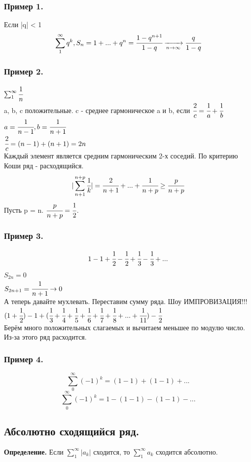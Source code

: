 \documentclass[12pt, paper]{article}
\begin{document}
\subsubsection*{Пример 1.}
Если |q| < 1
\[ \sum_1^\infty q^k, S_n = 1+...+q^n = \cfrac{1-q^{n+1}}{1-q} \xrightarrow[n\to\infty]{} \cfrac{q}{1-q} \]
\subsubsection*{Пример 2.}
$\sum_1^\infty \cfrac{1}{n}$\\
a, b, c положительные. c - среднее гармоническое a и b, если $\cfrac{2}{c} = \cfrac{1}{a} + \cfrac{1}{b}$\\
$a = \cfrac{1}{n-1}, b = \cfrac{1}{n+1}$\\
$\cfrac{2}{c} = (n - 1) + (n + 1) = 2n$\\
Каждый элемент является средним гармоническим 2-х соседий. По критерию Коши ряд - расходящийся.
\[ |\sum_{n+1}^{n+p} \cfrac{1}{k}| = \cfrac{2}{n+1} + ... + \cfrac{1}{n+p} \geq \cfrac{p}{n+p}\]
Пусть p = n. $\cfrac{p}{n+p} = \cfrac{1}{2}$.
\subsubsection*{\textbf{Пример 3.}}
\[ 1 - 1 + \cfrac{1}{2} - \cfrac{1}{2} + \cfrac{1}{3} - \cfrac{1}{3} + ...\]
$S_{2n} = 0$\\
$S_{2n+1} = \cfrac{1}{n+1} \to 0$\\
А теперь давайте мухлевать. Переставим сумму ряда. Шоу ИМПРОВИЗАЦИЯ!!!\\
$(1+\cfrac{1}{2}) - 1 + (\cfrac{1}{3} + \cfrac{1}{4} +\cfrac{1}{5} + \cfrac{1}{6} + \cfrac{1}{7} + \cfrac{1}{8} + ... + \cfrac{1}{11}) - \cfrac{1}{2}$\\
Берём много положительных слагаемых и вычитаем меньшее по модулю число. Из-за этого ряд расходится.
\subsubsection*{\textbf{Пример 4.}}
\[ \sum^\infty_{0} (-1)^k = (1-1) + (1-1) + ... \]
\[ \sum^\infty_{0} (-1)^k = 1 - (1-1) - (1-1) - ... \]

\subsection{Абсолютно сходящийся ряд.}
\begin{tcolorbox}
    \textbf{Определение.} Если $\sum^\infty_{1} |a_k|$ сходится, то $\sum^\infty_{1} a_k$ сходится абсолютно.
\end{tcolorbox}
\end{document}
